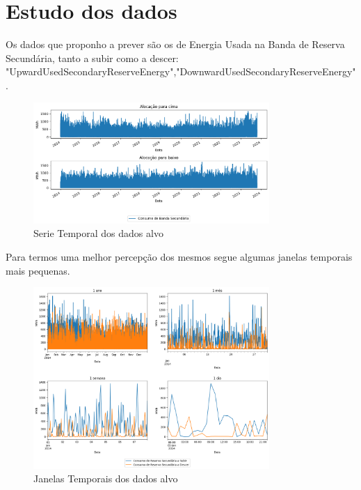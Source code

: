 
\section{Estudo dos dados}

Os dados que proponho a prever são os de Energia Usada na Banda de Reserva Secundária, tanto a subir como a descer: "UpwardUsedSecondaryReserveEnergy","DownwardUsedSecondaryReserveEnergy".\\



\begin{figure}[H]
  \centering
  \includegraphics[width=0.8\textwidth]{plots/consumo_originais.png}
  \caption{Serie Temporal dos dados alvo}
  \label{fig:targettimeseries}
\end{figure}


Para termos uma melhor percepção dos mesmos segue algumas janelas temporais mais pequenas.

\begin{figure}[H]
  \centering
  \includegraphics[width=0.8\textwidth]{plots/target_timeseries_windows.png}
  \caption{Janelas Temporais dos dados alvo}
  \label{fig:targettimeserieswindows}
\end{figure}


